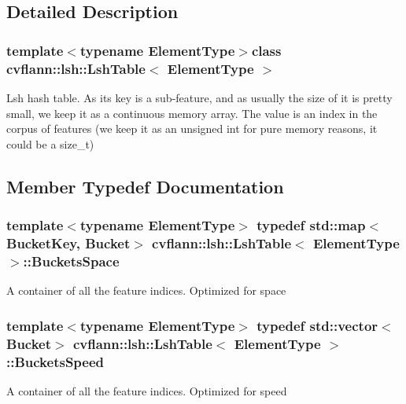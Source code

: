 \subsection{Detailed Description}
\subsubsection*{template$<$typename Element\-Type$>$class cvflann\-::lsh\-::\-Lsh\-Table$<$ Element\-Type $>$}

Lsh hash table. As its key is a sub-\/feature, and as usually the size of it is pretty small, we keep it as a continuous memory array. The value is an index in the corpus of features (we keep it as an unsigned int for pure memory reasons, it could be a size\-\_\-t) 

\subsection{Member Typedef Documentation}
\hypertarget{classcvflann_1_1lsh_1_1LshTable_aaec536a20e7ed000f05966d33fba1c3a}{
\subsubsection[{Buckets\-Space}]{\setlength{\rightskip}{0pt plus 5cm}template$<$typename Element\-Type$>$ typedef {\bf std\-::map}$<${\bf Bucket\-Key}, {\bf Bucket}$>$ {\bf cvflann\-::lsh\-::\-Lsh\-Table}$<$ Element\-Type $>$\-::{\bf Buckets\-Space}}}\label{classcvflann_1_1lsh_1_1LshTable_aaec536a20e7ed000f05966d33fba1c3a}
A container of all the feature indices. Optimized for space \hypertarget{classcvflann_1_1lsh_1_1LshTable_a5158c2837006305fa506668d12050d67}{
\subsubsection[{Buckets\-Speed}]{\setlength{\rightskip}{0pt plus 5cm}template$<$typename Element\-Type$>$ typedef std\-::vector$<${\bf Bucket}$>$ {\bf cvflann\-::lsh\-::\-Lsh\-Table}$<$ Element\-Type $>$\-::{\bf Buckets\-Speed}}}\label{classcvflann_1_1lsh_1_1LshTable_a5158c2837006305fa506668d12050d67}
A container of all the feature indices. Optimized for speed 

